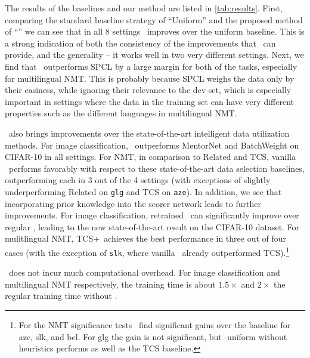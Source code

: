 
The results of the baselines and our method are listed in \autoref{tab:results}.
First, comparing the standard baseline strategy of ``Uniform'' and the proposed method of ``\dds'' we can see that in all 8 settings \dds~improves over the uniform baseline. This is a strong indication of both the consistency of the improvements that \dds~can provide, and the generality -- it works well in two very different settings. Next, we find that \dds~outperforms SPCL by a large margin for both of the tasks, especially for multilingual NMT. This is probably because SPCL weighs the data only by their easiness, while ignoring their relevance to the dev set, which is especially important in settings where the data in the training set can have very different properties such as the different languages in multilingual NMT. 

\dds~also brings improvements over the state-of-the-art intelligent data utilization methods. For image classification, \dds~outperforms MentorNet and BatchWeight on CIFAR-10 in all settings. For NMT, in comparison to Related and TCS, vanilla \dds~performs favorably with respect to these state-of-the-art data selection baselines, outperforming each in 3 out of the 4 settings (with exceptions of slightly underperforming Related on \texttt{glg} and TCS on \texttt{aze}).
In addition, we see that incorporating prior knowledge into the scorer network leads to further improvements. For image classification, retrained \dds~can significantly improve over regular \dds, leading to the new state-of-the-art result on the CIFAR-10 dataset. For mulitlingual NMT, TCS+\dds~achieves the best performance in three out of four cases (with the exception of \texttt{slk}, where vanilla \dds~already outperformed TCS).\footnote{For the NMT significance tests~\citep{significance_nmt} find significant gains over the baseline for aze, slk, and bel. For glg the gain is not significant, but \dds-uniform without heuristics performs as well as the TCS baseline.}

\dds~does not incur much computational overhead. For image classification and multilingual NMT respectively, the training time is about $1.5\times$ and $2\times$ the regular training time without \dds.
